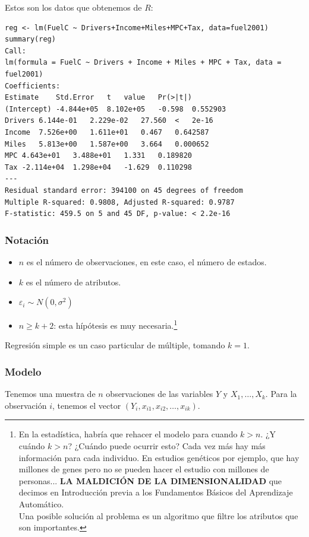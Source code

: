 Estos son los datos que obtenemos de $R$:

\begin{lstlisting}[style=mystyle]
reg <- lm(FuelC ~ Drivers+Income+Miles+MPC+Tax, data=fuel2001)
summary(reg)
Call:
lm(formula = FuelC ~ Drivers + Income + Miles + MPC + Tax, data = fuel2001)
Coefficients:
Estimate	Std.Error	t	value	Pr(>|t|)
(Intercept)	-4.844e+05	8.102e+05	-0.598	0.552903
Drivers	6.144e-01	2.229e-02	27.560	<	2e-16
Income	7.526e+00	1.611e+01	0.467	0.642587
Miles	5.813e+00	1.587e+00	3.664	0.000652
MPC	4.643e+01	3.488e+01	1.331	0.189820
Tax	-2.114e+04	1.298e+04	-1.629	0.110298
---
Residual standard error: 394100 on 45 degrees of freedom
Multiple R-squared: 0.9808, Adjusted R-squared: 0.9787
F-statistic: 459.5 on 5 and 45 DF, p-value: < 2.2e-16
\end{lstlisting}

\subsubsection{Notación}


\begin{itemize}
	\item $n$ es el número de observaciones, en este caso, el número de estados.
	\item $k$ es el número de atributos.
	\item $ε_i \sim N(0,σ^2)$
	\item $n\geq k+2$: esta hípótesis  es muy necesaria.\footnote{En la estadística, habría que rehacer el modelo para cuando $k>n$. ¿Y cuándo $k>n$? ¿Cuándo puede ocurrir esto? Cada vez más hay más información para cada individuo. En estudios genéticos por ejemplo, que hay millones de genes pero no se pueden hacer el estudio con millones de personas... \textbf{LA MALDICIÓN DE LA DIMENSIONALIDAD} que decimos en Introducción previa a los Fundamentos Básicos del Aprendizaje Automático.\\ Una posible solución al problema es un algoritmo que filtre los atributos que son importantes.}
\end{itemize}

Regresión simple es un caso particular de múltiple, tomando $k=1$.

\subsubsection{Modelo}

Tenemos una muestra de $n$ observaciones de las variables $Y$ y $X_1,…,X_k$. Para la observación $i$, tenemos el vector $(Y_i,x_{i1},x_{i2},…,x_{ik})$.

